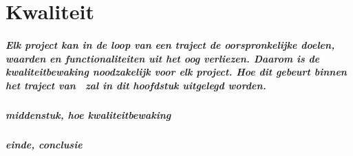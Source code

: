 \chapter{Kwaliteit} 

\paragraph{Elk project kan in de loop van een traject de oorspronkelijke doelen, waarden en functionaliteiten uit het oog verliezen. Daarom is de kwaliteitbewaking noodzakelijk voor elk project. Hoe dit gebeurt binnen het traject van \projectname\ zal in dit hoofdstuk uitgelegd worden.}
\paragraph{middenstuk, hoe kwaliteitbewaking}
\paragraph{einde, conclusie}
